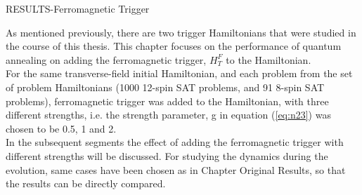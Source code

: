 \documentclass[12]{article}
\begin{document}
\begin{center}
\begin{Huge}
RESULTS-Ferromagnetic Trigger
\end{Huge}
\end{center}
As mentioned previously, there are two trigger Hamiltonians that were studied in the course of this thesis. This chapter focuses on the performance of quantum annealing on adding the ferromagnetic trigger, $H_T^F$ to the Hamiltonian. \\
For the same transverse-field initial Hamiltonian, and each problem from the set of problem Hamiltonians (1000 12-spin SAT problems, and 91 8-spin SAT problems), ferromagnetic trigger was added to the Hamiltonian, with three different strengths, i.e. the strength parameter, g in equation (\ref{eq:n23}) was chosen to be 0.5, 1 and 2.\\
In the subsequent segments the effect of adding the ferromagnetic trigger with different strengths will be discussed. For studying the dynamics during the evolution, same cases have been chosen as in Chapter Original Results, so that the results can be directly compared. 
\end{document}
